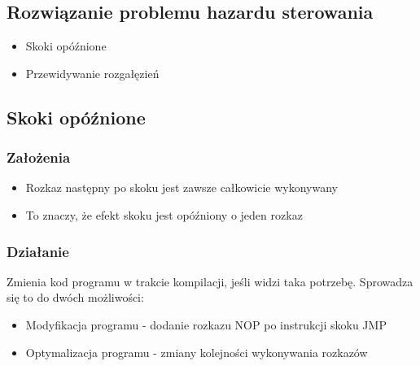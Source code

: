     	\subsection*{Rozwiązanie problemu hazardu sterowania}
    	\begin{itemize}
    		\item Skoki opóźnione
    		\item Przewidywanie rozgałęzień
    	\end{itemize}
    	\subsection*{Skoki opóźnione}
    	\subsubsection*{Założenia}
    	\begin{itemize}
    		\item Rozkaz następny po skoku jest zawsze całkowicie wykonywany
    		\item To znaczy, że efekt skoku jest opóźniony o jeden rozkaz
    	\end{itemize}
    	\subsubsection*{Działanie}
    	Zmienia kod programu w trakcie kompilacji, jeśli widzi taka potrzebę. Sprowadza się to do dwóch możliwości:
    	\begin{itemize}
    		\item Modyfikacja programu - dodanie rozkazu NOP po instrukcji skoku JMP
    		\item Optymalizacja programu - zmiany kolejności wykonywania rozkazów
    	\end{itemize}
